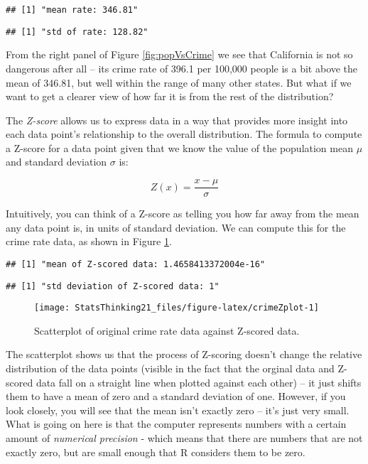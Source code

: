 \documentclass[]{book}
\newenvironment{Shaded}{\begin{snugshade}}{\end{snugshade}}
\newcommand{\KeywordTok}[1]{\textcolor[rgb]{0.13,0.29,0.53}{\textbf{#1}}}
\newcommand{\StringTok}[1]{\textcolor[rgb]{0.31,0.60,0.02}{#1}}
\newcommand{\OperatorTok}[1]{\textcolor[rgb]{0.81,0.36,0.00}{\textbf{#1}}}
\newcommand{\NormalTok}[1]{#1}
\theoremstyle{definition}
\theoremstyle{definition}
\theoremstyle{definition}
\theoremstyle{remark}
\begin{document}
\begin{verbatim}
## [1] "mean rate: 346.81"
\end{verbatim}

\begin{Shaded}
\end{Shaded}

\begin{verbatim}
## [1] "std of rate: 128.82"
\end{verbatim}

From the right panel of Figure \ref{fig:popVsCrime} we see that
California is not so dangerous after all -- its crime rate of 396.1 per
100,000 people is a bit above the mean of 346.81, but well within the
range of many other states. But what if we want to get a clearer view of
how far it is from the rest of the distribution?

The \emph{Z-score} allows us to express data in a way that provides more
insight into each data point's relationship to the overall distribution.
The formula to compute a Z-score for a data point given that we know the
value of the population mean \(\mu\) and standard deviation \(\sigma\)
is:

\[
Z(x) = \frac{x - \mu}{\sigma}
\]

Intuitively, you can think of a Z-score as telling you how far away from
the mean any data point is, in units of standard deviation. We can
compute this for the crime rate data, as shown in Figure
\ref{fig:crimeZplot}.

\begin{verbatim}
## [1] "mean of Z-scored data: 1.4658413372004e-16"
\end{verbatim}

\begin{verbatim}
## [1] "std deviation of Z-scored data: 1"
\end{verbatim}

\begin{figure}
\texttt{[image: StatsThinking21\_files/figure-latex/crimeZplot-1]} \caption{Scatterplot of original crime rate data against Z-scored data.}\label{fig:crimeZplot}
\end{figure}

The scatterplot shows us that the process of Z-scoring doesn't change
the relative distribution of the data points (visible in the fact that
the orginal data and Z-scored data fall on a straight line when plotted
against each other) -- it just shifts them to have a mean of zero and a
standard deviation of one. However, if you look closely, you will see
that the mean isn't exactly zero -- it's just very small. What is going
on here is that the computer represents numbers with a certain amount of
\emph{numerical precision} - which means that there are numbers that are
not exactly zero, but are small enough that R considers them to be zero.
\end{document}
